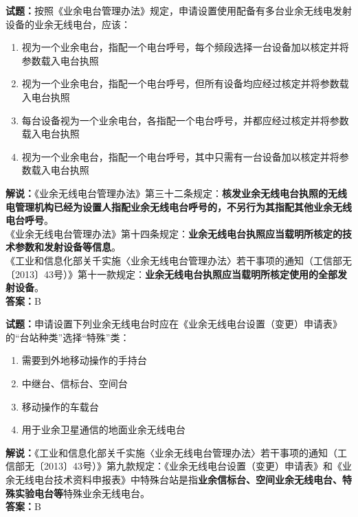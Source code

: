 \documentclass{ctexbook}
\begin{document}
\bigskip




\noindent\textbf{试题：}按照《业余电台管理办法》规定，申请设置使用配备有多台业余无线电发射设备的业余无线电台，应该：
\begin{enumerate}[leftmargin=3em]
\item 视为一个业余电台，指配一个电台呼号，每个频段选择一台设备加以核定并将参数载入电台执照
\item 视为一个业余电台，指配一个电台呼号，但所有设备均应经过核定并将参数载入电台执照
\item 每台设备视为一个业余电台，各指配一个电台呼号，并都应经过核定并将参数载入电台执照
\item 视为一个业余电台，指配一个电台呼号，其中只需有一台设备加以核定并将参数载入电台执照
\end{enumerate}
\noindent\textbf{解说：}《业余无线电台管理办法》第三十二条规定：\textbf{核发业余无线电台执照的无线电管理机构已经为设置人指配业余无线电台呼号的，不另行为其指配其他业余无线电台呼号}。\\
《业余无线电台管理办法》第十四条规定：\textbf{业余无线电台执照应当载明所核定的技术参数和发射设备等信息}。\\
《工业和信息化部关千实施〈业余无线电台管理办法〉若干事项的通知（工信部无〔2013〕43号）》第十一款规定：\textbf{业余无线电台执照应当载明所核定使用的全部发射设备}。\\\noindent\textbf{答案：}B

\bigskip




\noindent\textbf{试题：}申请设置下列业余无线电台时应在《业余无线电台设置（变更）申请表》 的“台站种类”选择“特殊”类：
\begin{enumerate}[leftmargin=3em]
\item 需要到外地移动操作的手持台
\item 中继台、信标台、空间台
\item 移动操作的车载台
\item 用于业余卫星通信的地面业余无线电台
\end{enumerate}
\noindent\textbf{解说：}《工业和信息化部关千实施〈业余无线电台管理办法〉若干事项的通知（工信部无〔2013〕43号）》第九款规定：《业余无线电台设置（变更）申请表》和《业余无线电台技术资料申报表》中特殊台站是指\textbf{业余信标台、空间业余无线电台、特殊实验电台等}特殊业余无线电台。\\\noindent\textbf{答案：}B

\bigskip
\end{document}
